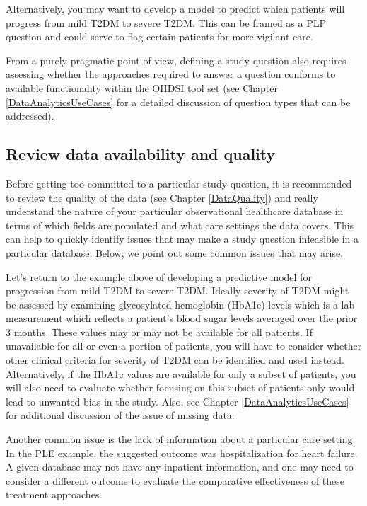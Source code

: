 \documentclass[11pt]{book}
\theoremstyle{definition}
\theoremstyle{definition}
\theoremstyle{definition}
\theoremstyle{remark}
\begin{document}
Alternatively, you may want to develop a model to predict which patients will progress from mild T2DM to severe T2DM. This can be framed as a PLP question and could serve to flag certain patients for more vigilant care.

From a purely pragmatic point of view, defining a study question also requires assessing whether the approaches required to answer a question conforms to available functionality within the OHDSI tool set (see Chapter \ref{DataAnalyticsUseCases} for a detailed discussion of question types that can be addressed).

\hypertarget{review-data-availability-and-quality}{%
\subsection{Review data availability and quality}\label{review-data-availability-and-quality}}

Before getting too committed to a particular study question, it is recommended to review the quality of the data (see Chapter \ref{DataQuality}) and really understand the nature of your particular observational healthcare database in terms of which fields are populated and what care settings the data covers. This can help to quickly identify issues that may make a study question infeasible in a particular database. Below, we point out some common issues that may arise.

Let's return to the example above of developing a predictive model for progression from mild T2DM to severe T2DM. Ideally severity of T2DM might be assessed by examining glycosylated hemoglobin (HbA1c) levels which is a lab measurement which reflects a patient's blood sugar levels averaged over the prior 3 months. These values may or may not be available for all patients. If unavailable for all or even a portion of patients, you will have to consider whether other clinical criteria for severity of T2DM can be identified and used instead. Alternatively, if the HbA1c values are available for only a subset of patients, you will also need to evaluate whether focusing on this subset of patients only would lead to unwanted bias in the study. Also, see Chapter \ref{DataAnalyticsUseCases} for additional discussion of the issue of missing data.

Another common issue is the lack of information about a particular care setting. In the PLE example, the suggested outcome was hospitalization for heart failure.
A given database may not have any inpatient information, and one may need to consider a different outcome to evaluate the comparative effectiveness of these treatment approaches.
\end{document}
